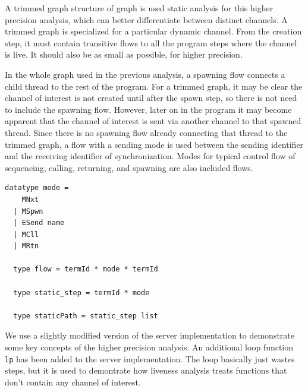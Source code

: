 \documentclass[letterpaper, 11pt]{extarticle}
\begin{document}
A trimmed graph structure of graph is used static analysis for this higher precision
analysis, which can better differentiate between distinct channels. 
A trimmed graph is specialized for a particular dynamic channel.  From the creation
step, it must contain transitive flows to all the program steps where the
channel is live. It should also be as small as possible, for higher precision.

In the whole graph used in the previous analysis, a spawning flow
connects a child thread to the rest of the program.  For a trimmed graph,
it may be clear the channel of interest is not created until after the spawn step,
so there is not need to include the spawning flow.  However, later on in the
program it may become apparent that the channel of interest is sent via another channel to
that spawned thread.  Since there is no spawning flow already connecting that
thread to the trimmed graph, a flow with a sending mode is used between the
sending identifier and the receiving identifier of synchronization.
Modes for typical control flow of
sequencing, calling, returning, and spawning are also included flows.

\begin{lstlisting}[language=logic, mathescape]
  datatype mode =
    MNxt
  | MSpwn
  | ESend name
  | MCll
  | MRtn

  type flow = termId * mode * termId

  type static_step = termId * mode

  type staticPath = static_step list
\end{lstlisting}

We use a slightly modified version of the server implementation
to demonstrate some key concepts of the higher precision analysis.
An additional loop function \lstinline{lp} has been added to the
server implementation. The loop basically just wastes steps, but it is used to demontrate how
liveness analysis treats functions that don't contain any channel of interest.
\end{document}
